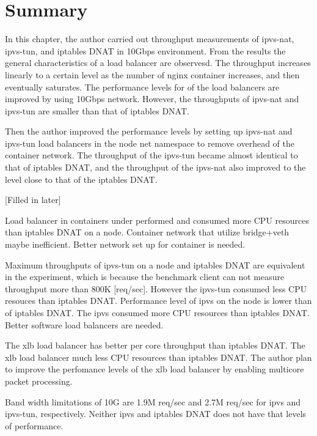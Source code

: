 \FloatBarrier

\section{Summary}

In this chapter, the author carried out throughput measurements of ipvs-nat, ipvs-tun, and iptables DNAT in 10Gbps environment.
From the results the general characteristics of a load balancer are observesd.
The throughput increases linearly to a certain level as the number of nginx container increases, and then eventually saturates.
The performance levels for of the load balancers are improved by using 10Gbps network.
However, the throughputs of ipvs-nat and ipvs-tun are smaller than that of iptables DNAT.

Then the author improved the performance levels by setting up ipvs-nat and ipvs-tun load balancers in the node net namespace to remove overhead of the container network.
The throughput of the ipvs-tun became almost identical to that of iptables DNAT, and the throughput of the ipvs-nat also improved to the level close to that of the iptables DNAT.

[Filled in later]



Load balancer in containers under performed and consumed more CPU resources than iptables DNAT on a node.
Container network that utilize bridge+veth maybe inefficient.
Better network set up for container is needed.

Maximum throughputs of ipvs-tun on a node and iptables DNAT are equivalent in the experiment, which is because the benchmark client can not measure throughput more than 800K [req/sec].
However the ipvs-tun consumed less CPU resouces than iptables DNAT.
Performance level of ipvs on the node is lower than of iptables DNAT.
The ipvs consumed more CPU resources than iptables DNAT.
Better software load balancers are needed.

The xlb load balancer has better per core throughput than iptables DNAT.
The xlb load balancer much less CPU resources than iptables DNAT.
The author plan to improve the perfomance levels of the xlb load balancer by enabling multicore packet processing. 


Band width limitations of 10G are 1.9M req/sec and 2.7M req/sec for ipvs and ipvs-tun, respectively.
Neither ipvs and iptables DNAT does not have that levels of performance. 

